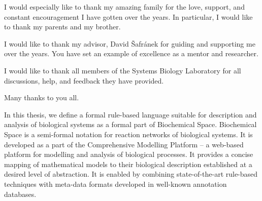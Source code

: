 \documentclass[12pt, twoside]{fithesis2} %
\begin{document}
\FrontMatter
\ThesisTitlePage

\begin{ThesisDeclaration}
\DeclarationText
\AdvisorName
\end{ThesisDeclaration}

\begin{ThesisThanks}
I would especially like to thank my amazing family for the love, support, and constant encouragement I have gotten over the years. 
 In particular, I would like to thank my parents and my brother.

\bigskip

\noindent I would like to thank my advisor, David Šafránek for guiding and 
supporting me over the years. You have set an example of excellence as a mentor and researcher.

\bigskip

\noindent  I would like to thank all members of the Systems Biology Laboratory for all discussions, help, and feedback they have provided.  

\bigskip

\noindent Many thanks to you all.

\end{ThesisThanks}

\begin{ThesisAbstract}
In this thesis, we define a formal rule-based language suitable for description and analysis of biological systems as a formal part of Biochemical Space. Biochemical Space is a semi-formal notation for reaction networks of biological systems. It is developed as a part of the Comprehensive Modelling Platform -- a web-based platform for modelling and analysis of biological processes. It provides a concise mapping of mathematical models to their biological description established at a desired level of abstraction. It is enabled by combining state-of-the-art rule-based techniques with meta-data formats developed in well-known annotation databases.
\end{ThesisAbstract}


\end{document}
